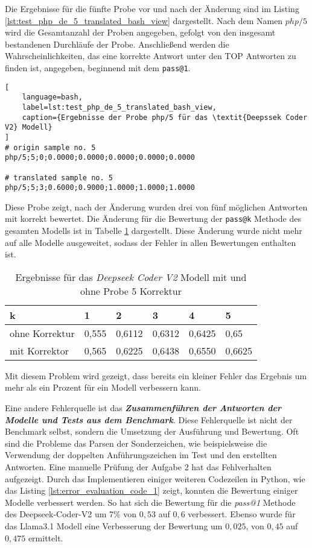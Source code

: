 Die Ergebnisse für die fünfte Probe vor und nach der Änderung sind im Listing \ref{lst:test_php_de_5_translated_bash_view} dargestellt. Nach dem Namen $php/5$ wird die Gesamtanzahl der Proben angegeben, gefolgt von den insgesamt bestandenen Durchläufe der Probe. Anschließend werden die Wahrscheinlichkeiten, das eine korrekte Antwort unter den TOP Antworten zu finden ist, angegeben, beginnend mit dem \texttt{pass@1}.\vspace{0.2cm}

\begin{lstlisting}[
	language=bash,
	label=lst:test_php_de_5_translated_bash_view,
	caption={Ergebnisse der Probe php/5 für das \textit{Deepssek Coder V2} Modell}
]
# origin sample no. 5
php/5;5;0;0.0000;0.0000;0.0000;0.0000;0.0000

# translated sample no. 5
php/5;5;3;0.6000;0.9000;1.0000;1.0000;1.0000
\end{lstlisting}

Diese Probe zeigt, nach der Änderung wurden drei von fünf möglichen Antworten mit korrekt bewertet. Die Änderung für die Bewertung der \texttt{pass@k} Methode des gesamten Modells ist in Tabelle \ref{tab:pass_at_k_results_bevor_after_translate} dargestellt. Diese Änderung wurde nicht mehr auf alle Modelle ausgeweitet, sodass der Fehler in allen Bewertungen enthalten ist.\vspace{0.2cm}

\begin{table}
	\begin{tabular}{|l|lllll|}
		\hline
		k & 1 & 2 & 3 & 4 & 5 \\
		\hline
		ohne Korrektur & 0,555 & 0,6112 & 0,6312 & 0,6425 & 0,65 \\
		mit Korrektor  & 0,565 & 0,6225 & 0,6438 & 0,6550 & 0,6625 \\
		\hline
		\hline
	\end{tabular}\centering
	\label{tab:pass_at_k_results_bevor_after_translate}
	\caption{Ergebnisse für das \textit{Deepseek Coder V2} Modell mit und ohne Probe 5 Korrektur }
\end{table}

Mit diesem Problem wird gezeigt, dass bereits ein kleiner Fehler das Ergebnis um mehr als ein Prozent für ein Modell verbessern kann.\vspace{0.2cm}

Eine andere Fehlerquelle ist das \textit{\textbf{Zusammenführen der Antworten der Modelle und Tests aus dem Benchmark}}. Diese Fehlerquelle ist nicht der Benchmark selbst, sondern die Umsetzung der Ausführung und Bewertung. Oft sind die Probleme das Parsen der Sonderzeichen, wie beispielsweise die Verwendung der doppelten Anführungszeichen im Test und den erstellten Antworten. Eine manuelle Prüfung der Aufgabe 2 hat das Fehlverhalten aufgezeigt. Durch das Implementieren einiger weiteren Codezeilen in Python, wie das Listing \ref{lst:error_evaluation_code_1} zeigt, konnten die Bewertung einiger Modelle verbessert werden. So hat sich die Bewertung für die \textit{pass@1} Methode des Deepseek-Coder-V2 um 7\% von $0,53$ auf $0,6$ verbessert. Ebenso wurde für das Llama3.1 Modell eine Verbesserung der Bewertung um $0,025$, von $0,45$ auf $0,475$ ermittelt.\vspace{0.2cm}

